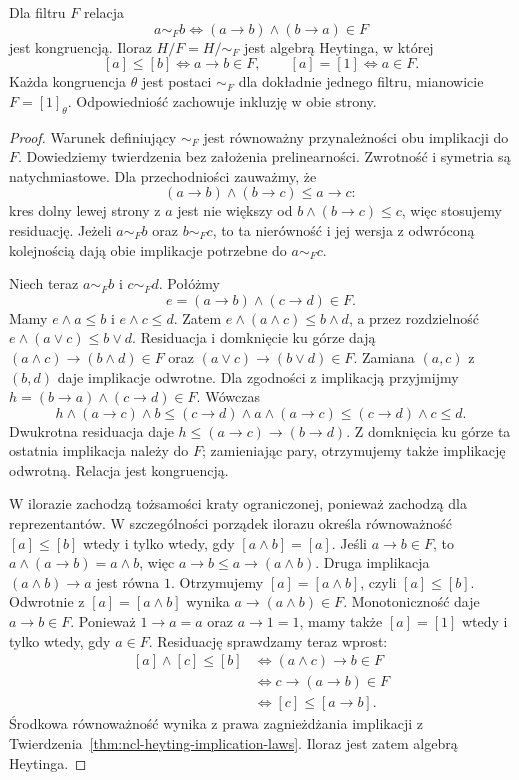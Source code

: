 \begin{twierdzenie}
\label{thm:ncl-heyting-filter-congruence}
Dla filtru $F$ relacja
\[
 a\sim_F b\iff (a\to b)\wedge(b\to a)\in F
\]
jest kongruencją. Iloraz $H/F=H/{\sim_F}$
jest algebrą Heytinga, w której
\[
 [a]\leq[b]\iff a\to b\in F,\qquad
 [a]=[1]\iff a\in F.
\]
Każda kongruencja $\theta$ jest postaci
$\sim_F$ dla dokładnie jednego filtru,
mianowicie $F=[1]_\theta$.
Odpowiedniość zachowuje inkluzję w obie strony.
\end{twierdzenie}
\begin{proof}
Warunek definiujący $\sim_F$ jest równoważny
przynależności obu implikacji do $F$.
Dowiedziemy twierdzenia bez założenia prelinearności.
Zwrotność i symetria są natychmiastowe.
Dla przechodniości zauważmy, że
\[
 (a\to b)\wedge(b\to c)\leq a\to c:
\]
kres dolny lewej strony z $a$ jest nie większy
od $b\wedge(b\to c)\leq c$, więc stosujemy residuację.
Jeżeli $a\sim_F b$ oraz $b\sim_F c$, to ta
nierówność i jej wersja z odwróconą kolejnością
dają obie implikacje potrzebne do $a\sim_F c$.

Niech teraz $a\sim_F b$ i $c\sim_F d$.
Połóżmy
\[
 e=(a\to b)\wedge(c\to d)\in F.
\]
Mamy $e\wedge a\leq b$ i $e\wedge c\leq d$.
Zatem $e\wedge(a\wedge c)\leq b\wedge d$,
a przez rozdzielność
$e\wedge(a\vee c)\leq b\vee d$.
Residuacja i domknięcie ku górze dają
$(a\wedge c)\to(b\wedge d)\in F$ oraz
$(a\vee c)\to(b\vee d)\in F$.
Zamiana $(a,c)$ z $(b,d)$ daje implikacje odwrotne.
Dla zgodności z implikacją przyjmijmy
$h=(b\to a)\wedge(c\to d)\in F$.
Wówczas
\[
 h\wedge(a\to c)\wedge b
 \leq (c\to d)\wedge a\wedge(a\to c)
 \leq (c\to d)\wedge c\leq d.
\]
Dwukrotna residuacja daje
$h\leq(a\to c)\to(b\to d)$.
Z domknięcia ku górze ta ostatnia implikacja
należy do $F$; zamieniając pary, otrzymujemy
także implikację odwrotną. Relacja jest kongruencją.

W ilorazie zachodzą tożsamości kraty ograniczonej,
ponieważ zachodzą dla reprezentantów. W szczególności
porządek ilorazu określa równoważność
$[a]\leq[b]$ wtedy i tylko wtedy, gdy $[a\wedge b]=[a]$.
Jeśli $a\to b\in F$, to
$a\wedge(a\to b)=a\wedge b$, więc
$a\to b\leq a\to(a\wedge b)$.
Druga implikacja $(a\wedge b)\to a$ jest równa $1$.
Otrzymujemy $[a]=[a\wedge b]$, czyli $[a]\leq[b]$.
Odwrotnie z $[a]=[a\wedge b]$ wynika
$a\to(a\wedge b)\in F$. Monotoniczność daje
$a\to b\in F$. Ponieważ $1\to a=a$ oraz
$a\to1=1$, mamy także $[a]=[1]$ wtedy i tylko
wtedy, gdy $a\in F$.
Residuację sprawdzamy teraz wprost:
\[
\begin{aligned}
 [a]\wedge[c]\leq[b]
 &\iff (a\wedge c)\to b\in F\\
 &\iff c\to(a\to b)\in F\\
 &\iff [c]\leq[a\to b].
\end{aligned}
\]
Środkowa równoważność wynika z prawa zagnieżdżania
implikacji z
Twierdzenia~\ref{thm:ncl-heyting-implication-laws}.
Iloraz jest zatem algebrą Heytinga.


\end{proof}
